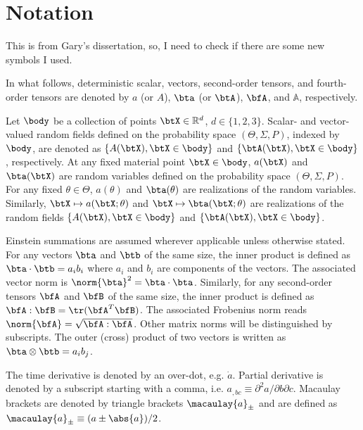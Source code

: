 \section{Notation}

{\color{red} This is from Gary's dissertation, so, I need to check if there are some new symbols I used.}

In what follows, deterministic scalar, vectors, second-order tensors, and fourth-order tensors are denoted by $a$ (or $A$), $\bta$ (or $\btA$), $\bfA$, and $\mathbb{A}$, respectively.

Let $\body$ be a collection of points $\btX \in \mathbb{R}^d$, $d \in \{1, 2, 3\}$. Scalar- and vector-valued random fields defined on the probability space $(\Theta, \Sigma, P)$, indexed by $\body$, are denoted as $\{ A(\btX), \btX \in \body \}$ and $\{ \btA(\btX), \btX \in \body \}$, respectively.
At any fixed material point $\btX \in \body$, $a(\btX)$ and $\bta(\btX)$ are random variables defined on the probability space $(\Theta, \Sigma, P)$. For any fixed $\theta \in \Theta$, $a(\theta)$ and $\bta(\theta)$ are realizations of the random variables.
Similarly, $\btX \mapsto a(\btX;\theta)$ and $\btX \mapsto \bta(\btX;\theta)$ are realizations of the random fields $\{ A(\btX), \btX \in \body \}$ and $\{ \btA(\btX), \btX \in \body \}$.

Einstein summations are assumed wherever applicable unless otherwise stated. For any vectors $\bta$ and $\btb$ of the same size, the inner product is defined as $\bta \cdot \btb = a_ib_i$ where $a_i$ and $b_i$ are components of the vectors. The associated vector norm is $\norm{\bta}^2 = \bta \cdot \bta$. Similarly, for any second-order tensors $\bfA$ and $\bfB$ of the same size, the inner product is defined as $\bfA : \bfB = \tr(\bfA^T \bfB)$. The associated Frobenius norm reads $\norm{\bfA} = \sqrt{\bfA : \bfA}$. Other matrix norms will be distinguished by subscripts.
The outer (cross) product of two vectors is written as $\bta \otimes \btb = a_ib_j$.

The time derivative is denoted by an over-dot, e.g. $\dot{a}$. Partial derivative is denoted by a subscript starting with a comma, i.e. $ a_{,bc} \equiv \partial^2 a / \partial b \partial c $.
Macaulay brackets are denoted by triangle brackets $\macaulay{a}_\pm$ and are defined as $\macaulay{a}_\pm \equiv (a\pm\abs{a})/2$.

